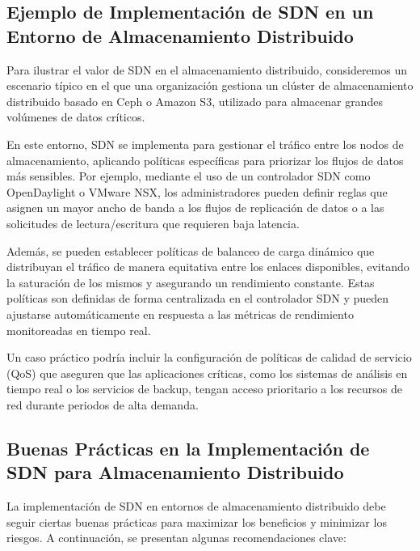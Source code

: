 {        \subsection{Ejemplo de Implementación de SDN en un Entorno de Almacenamiento Distribuido}
            Para ilustrar el valor de SDN en el almacenamiento distribuido, consideremos un escenario típico en el que una organización gestiona un clúster de almacenamiento distribuido basado en Ceph o Amazon S3, utilizado para almacenar grandes volúmenes de datos críticos.
            
            En este entorno, SDN se implementa para gestionar el tráfico entre los nodos de almacenamiento, aplicando políticas específicas para priorizar los flujos de datos más sensibles. Por ejemplo, mediante el uso de un controlador SDN como OpenDaylight o VMware NSX, los administradores pueden definir reglas que asignen un mayor ancho de banda a los flujos de replicación de datos o a las solicitudes de lectura/escritura que requieren baja latencia.
            
            Además, se pueden establecer políticas de balanceo de carga dinámico que distribuyan el tráfico de manera equitativa entre los enlaces disponibles, evitando la saturación de los mismos y asegurando un rendimiento constante. Estas políticas son definidas de forma centralizada en el controlador SDN y pueden ajustarse automáticamente en respuesta a las métricas de rendimiento monitoreadas en tiempo real.
            
            Un caso práctico podría incluir la configuración de políticas de calidad de servicio (QoS) que aseguren que las aplicaciones críticas, como los sistemas de análisis en tiempo real o los servicios de backup, tengan acceso prioritario a los recursos de red durante periodos de alta demanda.
            
        \subsection{Buenas Prácticas en la Implementación de SDN para Almacenamiento Distribuido}
            La implementación de SDN en entornos de almacenamiento distribuido debe seguir ciertas buenas prácticas para maximizar los beneficios y minimizar los riesgos. A continuación, se presentan algunas recomendaciones clave:
            
}
